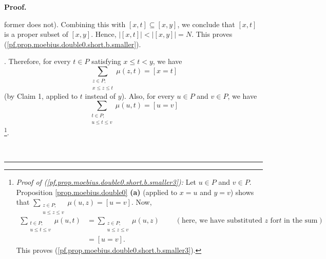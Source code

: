 \documentclass[numbers=enddot,12pt,final,onecolumn,notitlepage]{scrartcl}%
\theoremstyle{definition}
\newenvironment{proof}[1][Proof]{\noindent\textbf{#1.} }{\ \rule{0.5em}{0.5em}}
\newenvironment{vershort}{}{}
\let\sumnonlimits\sum
\renewcommand{\sum}{\sumnonlimits\limits}
\begin{document}
\begin{vershort}
\begin{proof}
{\begin{itemize}
former does not). Combining this with $\left[  x,t\right]  \subseteq\left[
x,y\right]  $, we conclude that $\left[  x,t\right]  $ is a proper subset of
$\left[  x,y\right]  $. Hence, $\left\vert \left[  x,t\right]  \right\vert
<\left\vert \left[  x,y\right]  \right\vert =N$. This proves
(\ref{pf.prop.moebius.double0.short.b.smaller}).
\end{itemize}
}. Therefore, for every $t\in P$ satisfying $x\leq t<y$, we have%
\begin{equation}
\sum_{\substack{z\in P;\\x\leq z\leq t}}\mu\left(  z,t\right)  =\left[
x=t\right]  \label{pf.prop.moebius.double0.short.b.smaller2}%
\end{equation}
(by Claim 1, applied to $t$ instead of $y$). Also, for every $u\in P$ and
$v\in P$, we have%
\begin{equation}
\sum_{\substack{t\in P;\\u\leq t\leq v}}\mu\left(  u,t\right)  =\left[
u=v\right]  \label{pf.prop.moebius.double0.short.b.smaller3}%
\end{equation}
\footnote{\textit{Proof of (\ref{pf.prop.moebius.double0.short.b.smaller3}):}
Let $u\in P$ and $v\in P$. Proposition \ref{prop.moebius.double0} \textbf{(a)}
(applied to $x=u$ and $y=v$) shows that $\sum_{\substack{z\in P;\\u\leq z\leq
v}}\mu\left(  u,z\right)  =\left[  u=v\right]  $. Now,%
\begin{align*}
\sum_{\substack{t\in P;\\u\leq t\leq v}}\mu\left(  u,t\right)   &
=\sum_{\substack{z\in P;\\u\leq z\leq v}}\mu\left(  u,z\right)
\ \ \ \ \ \ \ \ \ \ \left(  \text{here, we have substituted }z\text{ for
}t\text{ in the sum}\right) \\
&  =\left[  u=v\right]  .
\end{align*}
This proves (\ref{pf.prop.moebius.double0.short.b.smaller3}).}.


\end{proof}
\end{vershort}
\end{document}
